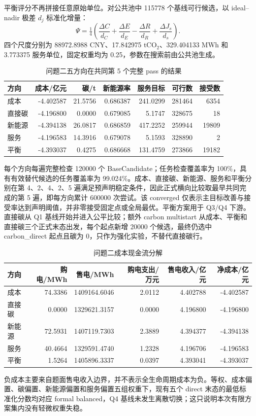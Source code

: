 \documentclass[withoutpreface,bwprint]{cumcmthesis}
\begin{document}
平衡评分不再拼接任意原始单位。对公共池中 115778 个基线可行候选，以 ideal--nadir 极差 $d_j$ 标准化增量：
\begin{equation}
\Psi=\tfrac14\left(\frac{\Delta C}{d_C}+\frac{\Delta E}{d_E}-\frac{\Delta R}{d_R}+\frac{\Delta J_s}{d_s}\right).
\end{equation}
四个尺度分别为 88972.8988 CNY、17.842975 tCO$_2$、329.404133 MWh 和 3.773375 服务单位，固定权重均为 0.25，参数在搜索前由公共池生成。

\begin{table}[H]\centering
{\small
\caption{问题二五方向在共同第 5 个完整 pass 的结果}\label{tab:q2schemes}
\begin{tabular}{lrrrrrr}\toprule
方向 & 成本/亿元 & 碳/t & 新能源率 & 服务目标 & 可行数 & 接受数\\\midrule
成本 & -4.402587 & 21.5756 & 0.686387 & 241.0299 & 281464 & 6354\\
直接碳 & -4.196800 & 0.0000 & 0.679085 & 5.1747 & 328675 & 18\\
新能源 & -4.394138 & 26.0817 & 0.686859 & 417.2252 & 259944 & 19809\\
服务 & -4.196583 & 14.3916 & 0.679078 & 5.1593 & 328890 & 2\\
平衡 & -4.393037 & 0.4275 & 0.686668 & 131.4759 & 273866 & 19182\\\bottomrule
\end{tabular}}
\end{table}

每个方向每遍完整检查 120000 个 BaseCandidate；任务检查覆盖率为 100\%，具有有效替代候选的任务覆盖率为 99.024\%。成本、直接碳、新能源、服务和平衡分别在第 4、2、4、2、5 遍满足预声明稳定条件，因此正式横向比较取最早共同完成的第 5 遍，即每方向累计 600000 次尝试。该 converged 仅表示主目标改善与接受率达到声明阈值，并非零接受固定点或全局最优。平衡方案用于 Q3/Q4 下游。直接碳从 Q1 基线开始并进入公平比较；额外 carbon multistart 从成本、平衡和直接碳三个正式末态出发，每个起点新增 20000 个候选，最终仍选中 carbon\_direct 起点且碳为 0，只作为强化实验，不替代直接碳行。

\begin{table}[H]\centering
{\small
\caption{问题二成本现金流分解}\label{tab:q2cost}
\begin{tabular}{lrrrrr}\toprule
方向 & 购电/MWh & 售电/MWh & 购电支出/万元 & 售电收入/亿元 & 净成本/亿元\\\midrule
成本 & 74.3386 & 1409164.6046 & 2.0112 & 4.402788 & -4.402587\\
直接碳 & 0.0000 & 1329621.3157 & 0.0000 & 4.196800 & -4.196800\\
新能源 & 72.5931 & 1407119.7303 & 2.3889 & 4.394377 & -4.394138\\
服务 & 40.4664 & 1329591.4740 & 1.2328 & 4.196706 & -4.196583\\
平衡 & 1.5264 & 1405896.3337 & 0.0397 & 4.393041 & -4.393037\\\bottomrule
\end{tabular}}
\end{table}
负成本主要来自题面售电收入边界，并不表示全生命周期成本为负。等权、成本偏置、碳偏置、新能源偏置和服务偏置五组权重下，现有五个 direct 末态的最低标准化分数均对应 formal balanced，Q4 基线未发生离散切换；这只说明本次有限方案集内没有轻微权重失稳。
\end{document}
